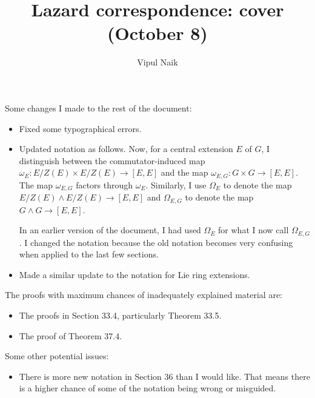 \documentclass[10pt]{amsart}
\title{Lazard correspondence: cover (October 8)}
\author{Vipul Naik}
\begin{document}
\maketitle
\onehalfspacing

Some changes I made to the rest of the document:

\begin{itemize}
\item Fixed some typographical errors.
\item Updated notation as follows. Now, for a central extension $E$ of
  $G$, I distinguish between the commutator-induced map $\omega_E:
  E/Z(E) \times E/Z(E) \to [E,E]$ and the map $\omega_{E,G}: G \times
  G \to [E,E]$. The map $\omega_{E,G}$ factors through
  $\omega_E$. Similarly, I use $\Omega_E$ to denote the map $E/Z(E)
  \wedge E/Z(E) \to [E,E]$ and $\Omega_{E,G}$ to denote the map $G
  \wedge G \to [E,E]$.

  In an earlier version of the document, I had used $\Omega_E$ for
  what I now call $\Omega_{E,G}$. I changed the notation because the
  old notation becomes very confusing when applied to the last few
  sections.
\item Made a similar update to the notation for Lie ring extensions.
\end{itemize}

The proofs with maximum chances of inadequately explained material are:

\begin{itemize}
\item The proofs in Section 33.4, particularly Theorem 33.5.
\item The proof of Theorem 37.4.
\end{itemize}

Some other potential issues:

\begin{itemize}
\item There is more new notation in Section 36 than I would like. That
  means there is a higher chance of some of the notation being wrong
  or misguided.
\end{itemize}
\end{document}
